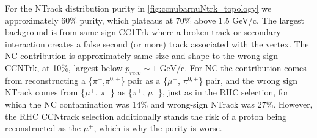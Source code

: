 For the NTrack distribution purity in \autoref{fig:ccnubarnuNtrk_topology} we approximately 60\% purity, which plateaus at 70\% above 1.5 GeV/c. The largest background is from same-sign CC1Trk where a broken track or secondary interaction creates a false second (or more) track associated with the vertex. The NC contribution is approximately same size and shape to the wrong-sign CCNTrk, at 10\%, largest below $p_{reco}\sim 1\text{ GeV/c}$. For NC the contribution comes from reconstructing a \{$\pi^-$,$\pi^{0,+}$\} pair as a \{$\mu^-$, $\pi^{0,+}$\} pair, and the wrong sign NTrack comes from \{$\mu^+$, $\pi^-$\} as \{$\pi^+$, $\mu^-$\}, just as in the \numubar RHC selection, for which the NC contamination was 14\% and wrong-sign NTrack was 27\%. However, the \numubar RHC CCNtrack selection additionally stands the risk of a proton being reconstructed as the $\mu^+$, which is why the purity is worse.
